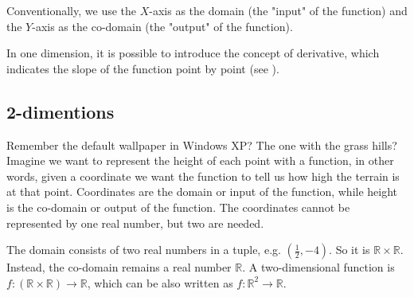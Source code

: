 Conventionally, we use the \( X \)-axis as the domain (the "input" of the function) and the \( Y \)-axis as the co-domain (the "output" of the function). 

\begin{center}
    \footnotesize
\end{center}

In one dimension, it is possible to introduce the concept of derivative, which indicates the slope of the function point by point (see ).

\subsection{2-dimentions}
\label{sec:op.dimensions.two}

Remember the default wallpaper in Windows XP? The one with the grass hills? Imagine we want to represent the height of each point with a function, in other words, given a coordinate we want the function to tell us how high the terrain is at that point.
Coordinates are the domain or input of the function, while height is the co-domain or output of the function. The coordinates cannot be represented by one real number, but two are needed.

The domain consists of two real numbers in a tuple, e.g. \( (\frac{1}{2}, -4) \). So it is \( \mathbb{R} \times \mathbb{R} \). Instead, the co-domain remains a real number \( \mathbb{R} \). A two-dimensional function is \( f : (\mathbb{R} \times \mathbb{R}) \rightarrow \mathbb{R} \), which can be also written as \( f : \mathbb{R}^2 \rightarrow \mathbb{R} \).

